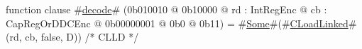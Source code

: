 function clause #\hyperref[sailMIPSzdecode]{decode}# (0b010010 @ 0b10000 @ rd : IntRegEnc @ cb : CapRegOrDDCEnc @ 0b00000001 @ 0b0 @ 0b11) = #\hyperref[sailMIPSzSome]{Some}#(#\hyperref[sailMIPSzCLoadLinked]{CLoadLinked}#(rd, cb, false, D)) /* CLLD  */
